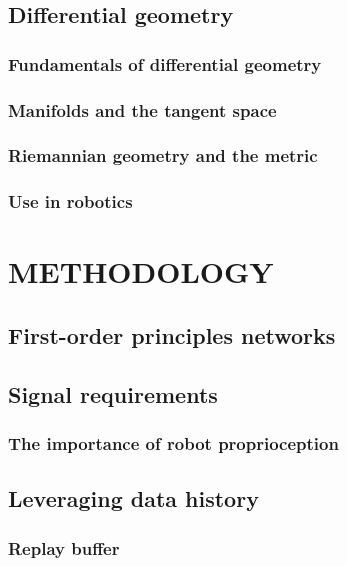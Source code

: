\documentclass{article}
\begin{document}
\subsection{Differential geometry}
\subsubsection{Fundamentals of differential geometry}
\subsubsection{Manifolds and the tangent space}
\subsubsection{Riemannian geometry and the metric}
\subsubsection{Use in robotics}

\section{METHODOLOGY}
\subsection{First-order principles networks}
\subsection{Signal requirements}
\subsubsection{The importance of robot proprioception}
\subsection{Leveraging data history}
\subsubsection{Replay buffer}
\end{document}
